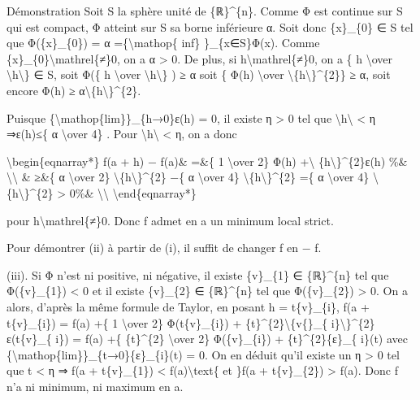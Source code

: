 \documentclass[]{article}
\begin{document}
Démonstration Soit S la sphère unité de \{ℝ\}\^{}\{n\}. Comme Φ est
continue sur S qui est compact, Φ atteint sur S sa borne inférieure α.
Soit donc \{x\}\_\{0\} ∈ S tel que Φ(\{x\}\_\{0\}) = α
=\{\textbackslash{}mathop\{ inf\} \}\_\{x∈S\}Φ(x). Comme
\{x\}\_\{0\}\textbackslash{}mathrel\{≠\}0, on a α \textgreater{} 0. De
plus, si h\textbackslash{}mathrel\{≠\}0, on a \{ h \textbackslash{}over
\textbackslash{}\textbar{}h\textbackslash{}\textbar{}\} ∈ S, soit Φ(\{ h
\textbackslash{}over
\textbackslash{}\textbar{}h\textbackslash{}\textbar{}\} ) ≥ α soit \{
Φ(h) \textbackslash{}over
\textbackslash{}\textbar{}\{h\textbackslash{}\textbar{}\}\^{}\{2\}\} ≥
α, soit encore Φ(h) ≥
α\textbackslash{}\textbar{}\{h\textbackslash{}\textbar{}\}\^{}\{2\}.

Puisque \{\textbackslash{}mathop\{lim\}\}\_\{h→0\}ε(h) = 0, il existe η
\textgreater{} 0 tel que
\textbackslash{}\textbar{}h\textbackslash{}\textbar{} \textless{} η
⇒\textbar{}ε(h)\textbar{}≤\{ α \textbackslash{}over 4\} . Pour
\textbackslash{}\textbar{}h\textbackslash{}\textbar{} \textless{} η, on
a donc

\textbackslash{}begin\{eqnarray*\} f(a + h) − f(a)\& =\&\{ 1
\textbackslash{}over 2\} Φ(h) +\textbackslash{}\textbar{}
\{h\textbackslash{}\textbar{}\}\^{}\{2\}ε(h) \%\&
\textbackslash{}\textbackslash{} \& ≥\&\{ α \textbackslash{}over 2\}
\textbackslash{}\textbar{}\{h\textbackslash{}\textbar{}\}\^{}\{2\} −\{ α
\textbackslash{}over 4\}
\textbackslash{}\textbar{}\{h\textbackslash{}\textbar{}\}\^{}\{2\} =\{ α
\textbackslash{}over 4\}
\textbackslash{}\textbar{}\{h\textbackslash{}\textbar{}\}\^{}\{2\}
\textgreater{} 0\%\& \textbackslash{}\textbackslash{}
\textbackslash{}end\{eqnarray*\}

pour h\textbackslash{}mathrel\{≠\}0. Donc f admet en a un minimum local
strict.

Pour démontrer (ii) à partir de (i), il suffit de changer f en − f.

(iii). Si Φ n'est ni positive, ni négative, il existe \{v\}\_\{1\} ∈
\{ℝ\}\^{}\{n\} tel que Φ(\{v\}\_\{1\}) \textless{} 0 et il existe
\{v\}\_\{2\} ∈ \{ℝ\}\^{}\{n\} tel que Φ(\{v\}\_\{2\}) \textgreater{} 0.
On a alors, d'après la même formule de Taylor, en posant h =
t\{v\}\_\{i\}, f(a + t\{v\}\_\{i\}) = f(a) +\{ 1 \textbackslash{}over
2\} Φ(t\{v\}\_\{i\}) +
\{t\}\^{}\{2\}\textbackslash{}\textbar{}\{v\{\}\_\{
i\}\textbackslash{}\textbar{}\}\^{}\{2\}ε(t\{v\}\_\{ i\}) = f(a) +\{
\{t\}\^{}\{2\} \textbackslash{}over 2\} Φ(\{v\}\_\{i\}) +
\{t\}\^{}\{2\}\{ε\}\_\{ i\}(t) avec
\{\textbackslash{}mathop\{lim\}\}\_\{t→0\}\{ε\}\_\{i\}(t) = 0. On en
déduit qu'il existe un η \textgreater{} 0 tel que \textbar{}t\textbar{}
\textless{} η ⇒ f(a + t\{v\}\_\{1\}) \textless{}
f(a)\textbackslash{}text\{ et \}f(a + t\{v\}\_\{2\}) \textgreater{}
f(a). Donc f n'a ni minimum, ni maximum en a.
\end{document}
